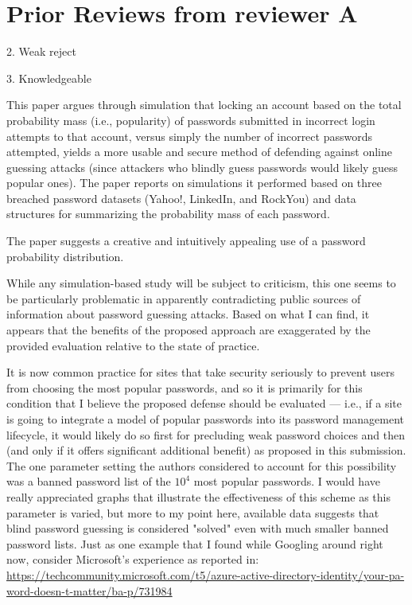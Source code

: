 \section{Prior Reviews from reviewer A}

 2. Weak reject

 3. Knowledgeable


This paper argues through simulation that locking an account based on
the total probability mass (i.e., popularity) of passwords submitted
in incorrect login attempts to that account, versus simply the number
of incorrect passwords attempted, yields a more usable and secure
method of defending against online guessing attacks (since attackers
who blindly guess passwords would likely guess popular ones).  The
paper reports on simulations it performed based on three breached
password datasets (Yahoo!, LinkedIn, and RockYou) and data structures
for summarizing the probability mass of each password.

 The paper suggests a creative and intuitively appealing use of a
password probability distribution.

 While any simulation-based study will be subject to criticism, this
one seems to be particularly problematic in apparently contradicting
public sources of information about password guessing attacks.  Based
on what I can find, it appears that the benefits of the proposed
approach are exaggerated by the provided evaluation relative to the
state of practice.


It is now common practice for sites that take security seriously to
prevent users from choosing the most popular passwords, and so it is
primarily for this condition that I believe the proposed defense
should be evaluated --- i.e., if a site is going to integrate a model
of popular passwords into its password management lifecycle, it would
likely do so first for precluding weak password choices and then (and
only if it offers significant additional benefit) as proposed in this
submission.  The one parameter setting the authors considered to
account for this possibility was a banned password list of the $10^4$
most popular passwords.  I would have really appreciated graphs that
illustrate the effectiveness of this scheme as this parameter is
varied, but more to my point here, available data suggests that blind
password guessing is considered "solved" even with much smaller banned
password lists.  Just as one example that I found while Googling
around right now, consider Microsoft's experience as reported in:
\url{https://techcommunity.microsoft.com/t5/azure-active-directory-identity/your-pa-word-doesn-t-matter/ba-p/731984}

